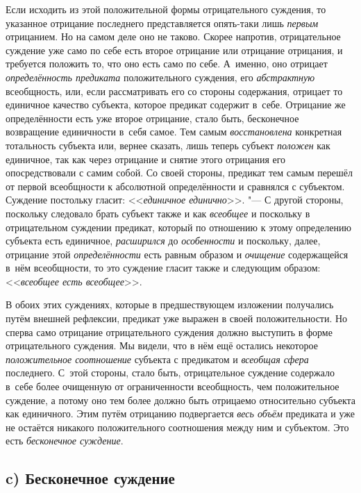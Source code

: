 Если исходить из этой положительной формы отрицательного суждения, то указанное
отрицание последнего представляется опять-таки лишь {\em первым} отрицанием.
Но на самом деле оно не таково. Скорее напротив, отрицательное суждение уже
само по себе есть второе отрицание или отрицание отрицания, и требуется
положить то, что оно есть само по себе. А~именно, оно отрицает
{\em определённость предиката} положительного суждения, его {\em абстрактную}
всеобщность, или, если рассматривать его со стороны содержания, отрицает то
единичное качество субъекта, которое предикат содержит в~себе. Отрицание же
определённости есть уже второе отрицание, стало быть, бесконечное возвращение
единичности в~себя самое. Тем самым {\em восстановлена} конкретная тотальность
субъекта или, вернее сказать, лишь теперь субъект {\em положен} как единичное,
так как через отрицание и снятие этого отрицания его опосредствовали с самим
собой. Со своей стороны, предикат тем самым перешёл от первой всеобщности к
абсолютной определённости и сравнялся с субъектом. Суждение постольку гласит:
<<{\em единичное единично}>>. "--- С другой стороны, поскольку следовало брать
субъект также и как {\em всеобщее} и поскольку в отрицательном суждении
предикат, который по отношению к этому определению субъекта есть единичное,
{\em расширился} до {\em особенности} и поскольку, далее, отрицание этой
{\em определённости} есть равным образом и {\em очищение} содержащейся в~нём
всеобщности, то это суждение гласит также и следующим образом:
<<{\em всеобщее есть всеобщее}>>.

В обоих этих суждениях, которые в предшествующем
изложении
получались путём внешней рефлексии, предикат уже выражен в
своей положительности. Но сперва само отрицание отрицательного суждения
должно выступить в форме отрицательного суждения. Мы видели, что в нём ещё
остались некоторое {\em положительное соотношение} субъекта с предикатом и
{\em всеобщая сфера} последнего. С~этой стороны, стало быть,
отрицательное суждение содержало в~себе более очищенную от ограниченности
всеобщность, чем положительное суждение, а потому оно тем более должно быть
отрицаемо относительно субъекта как единичного. Этим путём отрицанию
подвергается {\em весь объём} предиката и уже не остаётся никакого
положительного соотношения между ним и субъектом. Это есть
{\em бесконечное суждение}.

\subsection[c) Бесконечное суждение]{c) Бесконечное суждение}

